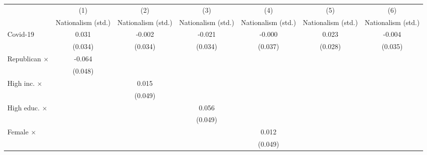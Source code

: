 {
\def\sym#1{\ifmmode^{#1}\else\(^{#1}\)\fi}
\begin{tabular}{l*{6}{c}}
\toprule
                    &\multicolumn{1}{c}{(1)}&\multicolumn{1}{c}{(2)}&\multicolumn{1}{c}{(3)}&\multicolumn{1}{c}{(4)}&\multicolumn{1}{c}{(5)}&\multicolumn{1}{c}{(6)}\\
                    &\multicolumn{1}{c}{Nationalism (std.)}&\multicolumn{1}{c}{Nationalism (std.)}&\multicolumn{1}{c}{Nationalism (std.)}&\multicolumn{1}{c}{Nationalism (std.)}&\multicolumn{1}{c}{Nationalism (std.)}&\multicolumn{1}{c}{Nationalism (std.)}\\
\midrule
Covid-19            &       0.031         &      -0.002         &      -0.021         &      -0.000         &       0.023         &      -0.004         \\
                    &     (0.034)         &     (0.034)         &     (0.034)         &     (0.037)         &     (0.028)         &     (0.035)         \\
\addlinespace
Republican $\times$ &      -0.064         &                     &                     &                     &                     &                     \\
                    &     (0.048)         &                     &                     &                     &                     &                     \\
\addlinespace
High inc. $\times$  &                     &       0.015         &                     &                     &                     &                     \\
                    &                     &     (0.049)         &                     &                     &                     &                     \\
\addlinespace
High educ. $\times$ &                     &                     &       0.056         &                     &                     &                     \\
                    &                     &                     &     (0.049)         &                     &                     &                     \\
\addlinespace
Female $\times$     &                     &                     &                     &       0.012         &                     &                     \\
                    &                     &                     &                     &     (0.049)         &                     &                     \\

\end{tabular}}
